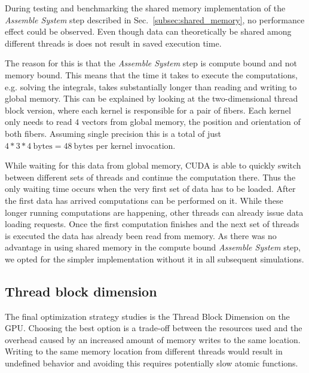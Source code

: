 During testing and benchmarking the shared memory implementation of the \emph{Assemble System} step described in Sec.~\ref{subsec:shared_memory}, no performance effect could be observed. Even though data can theoretically be shared among different threads is does not result in saved execution time.

The reason for this is that the \emph{Assemble System} step is compute bound and not memory bound. This means that the time it takes to execute the computations, e.g. solving the integrals, takes substantially longer than reading and writing to global memory. This can be explained by looking at the two-dimensional thread block version, where each kernel is responsible for a pair of fibers. Each kernel only needs to read $4$ vectors from global memory, the position and orientation of both fibers. Assuming single precision this is a total of just $4 * 3 * 4~\text{bytes} = 48~\text{bytes}$ per kernel invocation.

While waiting for this data from global memory, CUDA is able to quickly switch between different sets of threads and continue the computation there. Thus the only waiting time occurs when the very first set of data has to be loaded. After the first data has arrived computations can be performed on it. While these longer running computations are happening, other threads can already issue data loading requests. Once the first computation finishes and the next set of threads is executed the data has already been read from memory. As there was no advantage in using shared memory in the compute bound \emph{Assemble System} step, we opted for the simpler implementation without it in all subsequent simulations.

\subsection{Thread block dimension}
\label{subsec:bench_thread_block}

The final optimization strategy studies is the Thread Block Dimension on the GPU. Choosing the best option is a trade-off between the resources used and the overhead caused by an increased amount of memory writes to the same location. Writing to the same memory location from different threads would result in undefined behavior and avoiding this requires potentially slow atomic functions.

